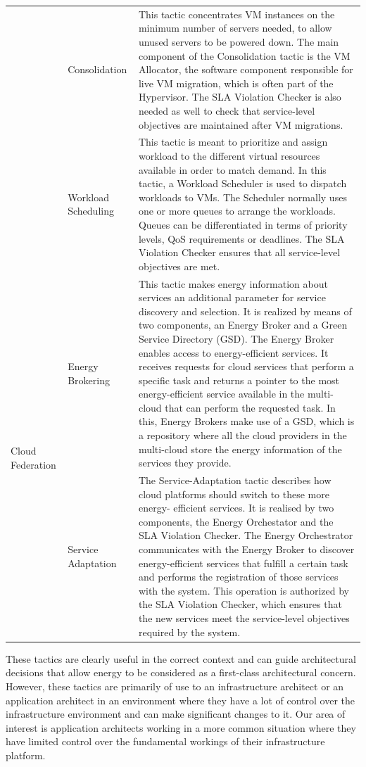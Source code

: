 \begin{small}
\begin{longtable}{| l | l | p{8cm} |}
& Consolidation & This tactic concentrates VM instances on the minimum number of servers needed, to allow unused servers to be powered down. The main component of the Consolidation tactic is the VM Allocator, the software component responsible for live VM migration, which is often part of the Hypervisor. The SLA Violation Checker is also needed as well to check that service-level objectives are maintained after VM migrations. \\ \cline{2-3}
& Workload Scheduling & This tactic is meant to prioritize and assign workload to the different virtual resources available in order to match demand. In this tactic, a Workload Scheduler is used to dispatch workloads to VMs. The Scheduler normally uses one or more queues to arrange the workloads. Queues can be differentiated in terms of priority levels, QoS requirements or deadlines. The SLA Violation Checker ensures that all service-level objectives are met. \\
\hline
\multirow{2}{*}{Cloud Federation} & Energy Brokering & This tactic makes energy information about services an additional parameter for service discovery and selection. It is realized by means of two components, an Energy Broker and a Green Service Directory (GSD). The Energy Broker enables access to energy-efficient services. It receives requests for cloud services that perform a specific task and returns a pointer to the most energy-efficient service available in the multi-cloud that can perform the requested task. In this, Energy Brokers make use of a GSD, which is a repository where all the cloud providers in the multi-cloud store the energy information of the services they provide. \\ \cline{2-3}
& Service Adaptation & The Service-Adaptation tactic describes how cloud platforms should switch to these more energy- efficient services.  It is realised by two components, the Energy Orchestator and the SLA Violation Checker.  The Energy Orchestrator communicates with the Energy Broker to discover energy-efficient services that fulfill a certain task and performs the registration of those services with the system. This operation is authorized by the SLA Violation Checker, which ensures that the new services meet the service-level objectives required by the system. \\
\hline

\end{longtable}
\end{small}

These tactics are clearly useful in the correct context and can guide architectural decisions that allow energy to be considered as a first-class architectural concern.  However, these tactics are primarily of use to an infrastructure architect or an application architect in an environment where they have a lot of control over the infrastructure environment and can make significant changes to it.  Our area of interest is application architects working in a more common situation where they have limited control over the fundamental workings of their infrastructure platform.

